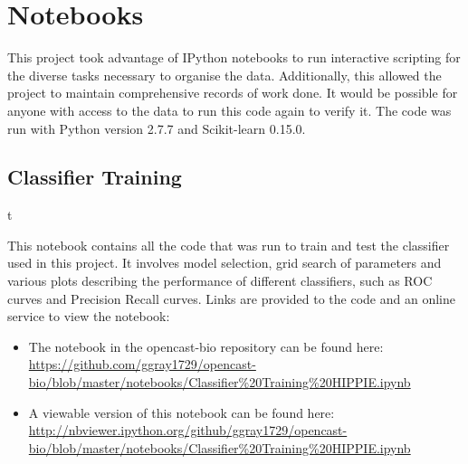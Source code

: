 \appendix
\chapter{Notebooks}

This project took advantage of IPython notebooks to run interactive scripting for the diverse tasks necessary to organise the data.
Additionally, this allowed the project to maintain comprehensive records of work done.
It would be possible for anyone with access to the data to run this code again to verify it.
The code was run with Python version 2.7.7 and Scikit-learn 0.15.0.

\section{Classifier Training}
\label{app:classtrain}t

This notebook contains all the code that was run to train and test the classifier used in this project.
It involves model selection, grid search of parameters and various plots describing the performance of different classifiers, such as ROC curves and Precision Recall curves.
Links are provided to the code and an online service to view the notebook:

\begin{itemize}
    \item The notebook in the opencast-bio repository can be found here: \url{https://github.com/ggray1729/opencast-bio/blob/master/notebooks/Classifier%20Training%20HIPPIE.ipynb}
    \item A viewable version of this notebook can be found here: \url{http://nbviewer.ipython.org/github/ggray1729/opencast-bio/blob/master/notebooks/Classifier%20Training%20HIPPIE.ipynb}
\end{itemize}



\lipsum[10-20]


